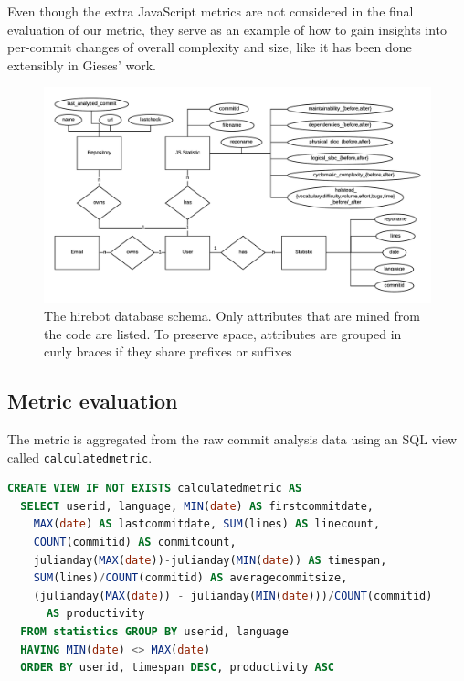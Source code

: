Even though the extra JavaScript metrics are not considered in the final evaluation of our metric, they serve as an example of how to gain insights into per-commit changes of overall complexity and size, like it has been done extensibly in Gieses' work\cite{pg:2014}.

\begin{figure}
  \centering
  \includegraphics[width=35em]{gfx/schema.png}
  \caption{The hirebot database schema. Only attributes that are mined from the code are listed. To preserve space, attributes are grouped in curly braces if they share prefixes or suffixes}
  \label{fig:schema}
\end{figure}

\subsection{Metric evaluation}
The metric is aggregated from the raw commit analysis data using an SQL view called \verb=calculatedmetric=.


\begin{lstlisting}[language=SQL, frame=false]
CREATE VIEW IF NOT EXISTS calculatedmetric AS
  SELECT userid, language, MIN(date) AS firstcommitdate,
    MAX(date) AS lastcommitdate, SUM(lines) AS linecount,
    COUNT(commitid) AS commitcount,
    julianday(MAX(date))-julianday(MIN(date)) AS timespan,
    SUM(lines)/COUNT(commitid) AS averagecommitsize,
    (julianday(MAX(date)) - julianday(MIN(date)))/COUNT(commitid)
      AS productivity
  FROM statistics GROUP BY userid, language
  HAVING MIN(date) <> MAX(date)
  ORDER BY userid, timespan DESC, productivity ASC
\end{lstlisting}

